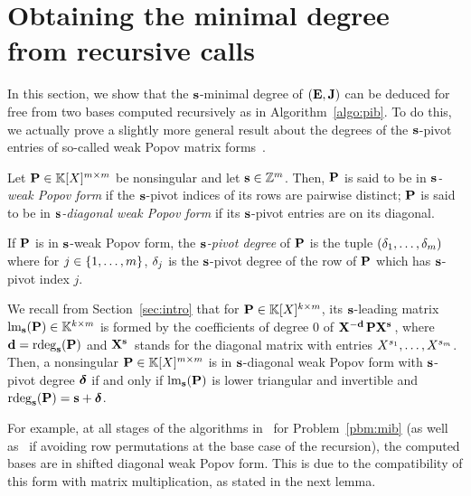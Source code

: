 \documentclass[preprint]{sig-alternate-05-2015}
\begin{document}
\section{Obtaining the minimal degree \\ from recursive calls}
\label{sec:mindeg_invariant}

In this section, we show that the $\mathbf{s}$-minimal degree of
$(\evMat,\mulmat)$ can be deduced for free from two bases computed recursively
as in Algorithm~\ref{algo:pib}. To do this, we actually prove a slightly more
general result about the degrees of the $\mathbf{s}$-pivot entries of so-called
weak Popov matrix forms~\cite{MulSto03}.

\begin{dfn}
\label{dfn:weak_popov}
Let $\mat{P} \in \polMatSpace[\rdim]$ be nonsingular and let $\mathbf{s} \in
\mathbb{Z}^{m}$. Then, $\mat{P}$ is said to be in \emph{$\mathbf{s}$-weak Popov form}
if the $\mathbf{s}$-pivot indices of its rows are pairwise distinct; $\mat{P}$ is
said to be in \emph{$\mathbf{s}$-diagonal weak Popov form} if its $\mathbf{s}$-pivot
entries are on its diagonal.

If $\mat{P}$ is in $\mathbf{s}$-weak Popov form, the \emph{$\mathbf{s}$-pivot degree}
of $\mat{P}$ is the tuple $(\delta_1,\ldots,\delta_m)$ where for $j \in
\{1,\ldots,m\}$, $\delta_j$ is the $\mathbf{s}$-pivot degree of the row of
$\mat{P}$ which has $\mathbf{s}$-pivot index $j$. 
\end{dfn}

We recall from Section~\ref{sec:intro} that for $\mat{P} \in
\polMatSpace[k][\rdim]$, its $\mathbf{s}$-leading matrix
$\leadingMat[\shifts]{\mat{P}} \in \matSpace[k][\rdim]$ is formed by the
coefficients of degree $0$ of $\shiftMat{-\shifts[d]} \mat{P}
\shiftMat{\shifts}$, where $\shifts[d] = \rdeg[\shifts]{\mat{P}}$ and
$\shiftMat{\shifts}$ stands for the diagonal matrix with entries
$X^{s_{1}}, \ldots, X^{s_{m}}$. Then, a nonsingular $\intBasis \in
\intSpace$ is in $\mathbf{s}$-diagonal weak Popov form with $\mathbf{s}$-pivot degree
$\boldsymbol{\delta}$ if and only if $\leadingMat[\shifts]{\mat{P}}$ is lower triangular
and invertible and $\rdeg[\shifts]{\intBasis} = \shifts+\minDegs$. 

For example, at all stages of the algorithms
in~\cite{BarBul92,BecLab94,JeNeScVi15} for Problem~\ref{pbm:mib} (as well
as~\cite{GiJeVi03} if avoiding row permutations at the base case of the
recursion), the computed bases are in shifted diagonal weak Popov form. This is
due to the compatibility of this form with matrix multiplication, as stated in
the next lemma.
\end{document}
